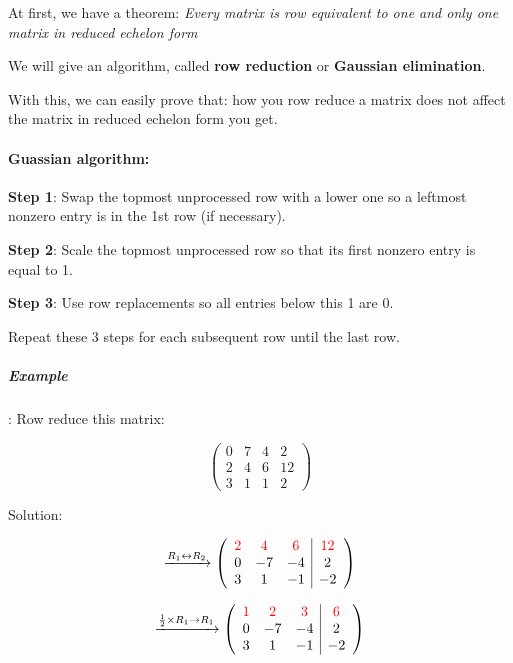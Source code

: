 \documentclass[a4paper,12pt]{article}
\begin{document}
    \begin{frame}
        \small

        \small At first, we have a theorem: \textit{Every matrix is row equivalent to one and only one matrix in reduced echelon form}
        
        \small We will give an algorithm, called \textbf{row reduction} or \textbf{Gaussian elimination}.

        With this, we can easily prove that: how you row reduce a matrix does not affect the matrix in reduced echelon form you get. 

        \paragraph{Guassian algorithm:}

        \small \textbf{Step 1}: Swap the topmost unprocessed row with a lower one so a leftmost nonzero entry is in the 1st row (if necessary).
        
        \textbf{Step 2}: Scale the topmost unprocessed row so that its first nonzero entry is equal to 1.
        
        \textbf{Step 3}: Use row replacements so all entries below this 1 are 0.

        Repeat these 3 steps for each subsequent row until the last row.

        \subparagraph{Example}: Row reduce this matrix:

        \[
        \left(
        \begin{array}{ccc|c}
        0 & 7 & 4 & 2 \\
        2 & 4 & 6 & 12 \\
        3 & 1 & 1 & 2
        \end{array}
        \right)
        \]

        Solution:

        \[
        \xrightarrow{R_1 \leftrightarrow R_2}
        \left( \begin{array}{ccc|c}
        \textcolor{red}{2} & \textcolor{red}{4} & \textcolor{red}{6} & \textcolor{red}{12} \\
        0 & -7 & -4 & 2 \\
        3 & 1 & -1 & -2
        \end{array} \right)
        \]
        
        \[
        \xrightarrow{\frac{1}{2} \times R_1 \rightarrow R_1}
        \left( \begin{array}{ccc|c}
        \textcolor{red}{1} & \textcolor{red}{2} & \textcolor{red}{3} & \textcolor{red}{6} \\
        0 & -7 & -4 & 2 \\
        3 & 1 & -1 & -2
        \end{array} \right)
        \]
        

\end{frame}
\end{document}
